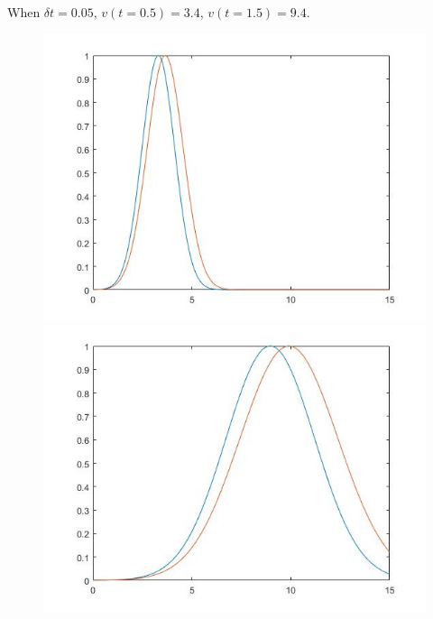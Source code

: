 When $\delta t = 0.05$, $v(t = 0.5) = 3.4$, $v(t = 1.5) = 9.4$.
\begin{figure}[!htb]
\centering
\begin{minipage}{0.45\textwidth}
\includegraphics[width = \textwidth]{5(b)(1).jpg}
\end{minipage}
\begin{minipage}{0.45\textwidth}
\includegraphics[width = \textwidth]{5(b)(2).jpg}
\end{minipage} \\
\begin{minipage}{0.45\textwidth}

\end{minipage}
\end{figure}
